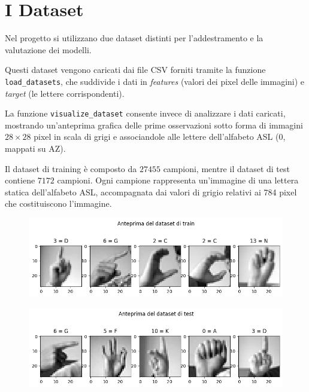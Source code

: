 \documentclass{article}
\begin{document}
\section{I Dataset}

Nel progetto si utilizzano due dataset distinti per l'addestramento e la valutazione dei modelli. 

Questi dataset vengono caricati dai file CSV forniti tramite la funzione \texttt{load\_datasets}, che suddivide i dati in \textit{features} 
(valori dei pixel delle immagini) e \textit{target} (le lettere corrispondenti). 

La funzione \texttt{visualize\_dataset} consente invece di analizzare i dati caricati, mostrando un'anteprima 
grafica delle prime osservazioni sotto forma di immagini \(28\times28\) pixel in scala di grigi e associandole 
alle lettere dell'alfabeto ASL (0, mappati su A\-Z).

Il dataset di training è composto da \(27455\) campioni, mentre il dataset di test contiene \(7172\) campioni. 
Ogni campione rappresenta un'immagine di una lettera statica dell'alfabeto ASL, accompagnata dai valori 
di grigio relativi ai 784 pixel che costituiscono l'immagine.

\begin{figure}[H]
    \centering
    \includegraphics[scale=0.5]{"Figures/output.png"}
    \label{fig:dataset}
\end{figure}

\begin{figure}[H]  
    \centering
    \includegraphics[scale=0.5]{"Figures/output1.png"}
    \label{fig:dataset_test}
\end{figure}
\end{document}
